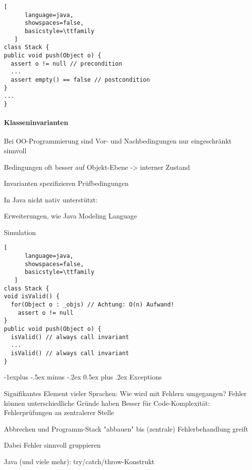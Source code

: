 \documentclass[10pt]{article}
\makeatletter
\renewcommand{\subsection}{\@startsection{subsection}{2}{0mm}%
                                {-1explus -.5ex minus -.2ex}%
                                {0.5ex plus .2ex}%
                                {\normalfont\normalsize\bfseries}}
\makeatother
\begin{document}
\begin{lstlisting}[
      language=java,
      showspaces=false,
      basicstyle=\ttfamily
   ]
class Stack {
public void push(Object o) {
  assert o != null // precondition
  ...
  assert empty() == false // postcondition
}
...
}
\end{lstlisting}

\paragraph{Klasseninvarianten}
\begin{itemize*}
  \item Bei OO-Programmierung sind Vor- und Nachbedingungen nur eingeschränkt sinnvoll
  \item Bedingungen oft besser auf Objekt-Ebene -> interner Zustand
  \item Invarianten spezifizieren Prüfbedingungen
  \item In Java nicht nativ unterstützt:
  \begin{itemize*}
    \item Erweiterungen, wie Java Modeling Language
    \item Simulation
  \end{itemize*}
\end{itemize*}

\begin{lstlisting}[
      language=java,
      showspaces=false,
      basicstyle=\ttfamily
   ]
class Stack {
void isValid() {
  for(Object o : _objs) // Achtung: O(n) Aufwand!
    assert o != null
}
public void push(Object o) {
  isValid() // always call invariant
  ...
  isValid() // always call invariant
}
\end{lstlisting}


\subsection{Exceptions}

Signifikantes Element vieler Sprachen: Wie wird mit Fehlern umgegangen?
Fehler können unterschiedliche Gründe haben
Besser für Code-Komplexität: Fehlerprüfungen an zentralerer Stelle
\begin{itemize*}
  \item Abbrechen und Programm-Stack "abbauen" bis (zentrale) Fehlerbehandlung greift
  \item Dabei Fehler sinnvoll gruppieren
  \item Java (und viele mehr): try/catch/throw-Konstrukt
\end{itemize*}
\end{document}
